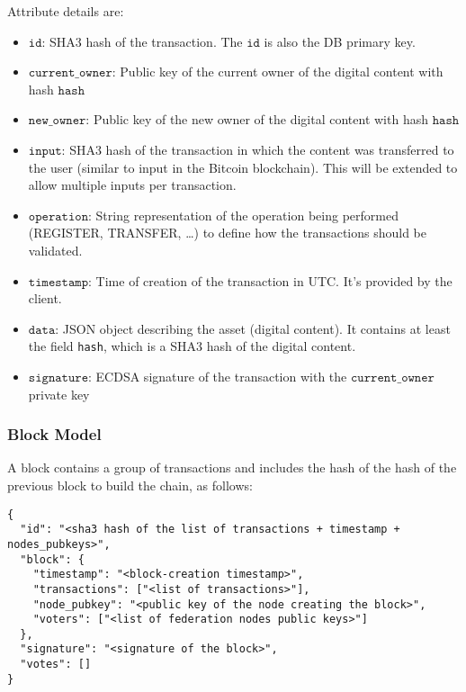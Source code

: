 Attribute details are:
\begin{itemize}
 \item $\mathtt{id}$: SHA3 hash of the transaction. The $\mathtt{id}$ is also the DB primary key.
 \item $\mathtt{current\_owner}$: Public key of the current owner of the digital content with hash $\mathtt{hash}$
 \item $\mathtt{new\_owner}$: Public key of the new owner of the digital content with hash $\mathtt{hash}$
 \item $\mathtt{input}$: SHA3 hash of the transaction in which the content was transferred to the user (similar to input in the Bitcoin blockchain). This will be extended to allow multiple inputs per transaction. 
 \item $\mathtt{operation}$: String representation of the operation being performed (REGISTER, TRANSFER, \ldots) to define how the transactions should be validated.
 \item $\mathtt{timestamp}$: Time of creation of the transaction in UTC. It's provided by the client.
 \item $\mathtt{data}$: JSON object describing the asset (digital content). It contains at least the field \texttt{hash}, which is a SHA3 hash of the digital content. 
 \item $\mathtt{signature}$: ECDSA signature of the transaction with the $\mathtt{current\_owner}$ private key
\end{itemize}

\subsubsection{Block Model}
A block contains a group of transactions and includes the hash of the hash of the previous block to build the chain, as follows:

\begin{lstlisting}[style=json]
{
  "id": "<sha3 hash of the list of transactions + timestamp + nodes_pubkeys>",
  "block": {
    "timestamp": "<block-creation timestamp>",
    "transactions": ["<list of transactions>"], 
    "node_pubkey": "<public key of the node creating the block>", 
    "voters": ["<list of federation nodes public keys>"]
  },
  "signature": "<signature of the block>",
  "votes": []
}
\end{lstlisting}

